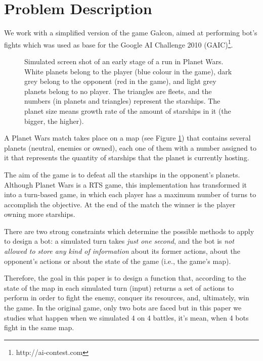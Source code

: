\documentclass{llncs}
\begin{document}
\section{Problem Description}
\label{sec:problemDescription}

We work with a simplified version of the game Galcon, aimed at performing bot's fights which was used as base for the Google AI Challenge 2010 (GAIC)\footnote{http://ai-contest.com}.

\begin{figure}[ht]
\begin{center}
\end{center}
\caption{Simulated screen shot of an early stage of a run in Planet Wars. White planets belong to the player (blue colour in the game), dark grey belong to the opponent (red in the game), and light grey planets belong to no player. The triangles are fleets, and the numbers (in planets and triangles) represent the starships. The planet size means growth rate of the amount of starships in it (the bigger, the higher).}
\label{figura:PlanetWars1}
\end{figure}

A Planet Wars match takes place on a map (see Figure \ref{figura:PlanetWars1}) that contains several planets (neutral, enemies or owned), each one of them with a number assigned to it that represents the quantity of starships that the planet is currently hosting. 

The aim of the game is to defeat all the starships in the opponent's planets. Although Planet Wars is a RTS game, this implementation has transformed it into a turn-based game, in which each player has a maximum number of turns to accomplish the objective. At the end of the match the winner is the player owning more starships. 

There are two strong constraints which determine the possible methods to apply to design
a bot: a simulated turn takes \textit{just one second}, and the bot is \textit{not allowed to store any kind of information} about its former actions, about the opponent's actions or about the state of the game (i.e., the game's map).

Therefore, the goal in this paper is to design a function that, according to the state of the map in each simulated turn (input) returns a set of actions to perform in order to fight the enemy, conquer its resources, and, ultimately, win the game. In the original game, only two bots are faced but in this paper we studies what happen when we simulated 4 on 4 battles, it's mean, when 4 bots fight in the same map.
\end{document}
